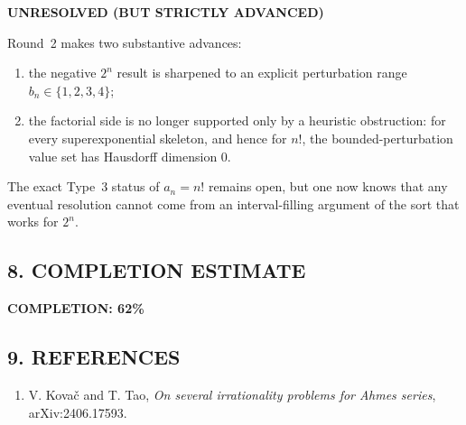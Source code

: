 \textbf{UNRESOLVED (BUT STRICTLY ADVANCED)}

\medskip
Round~2 makes two substantive advances:

\begin{enumerate}
\item the negative $2^n$ result is sharpened to an explicit perturbation range $b_n\in\{1,2,3,4\}$;
\item the factorial side is no longer supported only by a heuristic obstruction: for every superexponential skeleton, and hence for $n!$, the bounded-perturbation value set has Hausdorff dimension $0$.
\end{enumerate}

The exact Type~3 status of $a_n=n!$ remains open, but one now knows that any eventual resolution cannot come from an interval-filling argument of the sort that works for $2^n$.

\subsection*{8. COMPLETION ESTIMATE}

\textbf{COMPLETION: 62\%}

\subsection*{9. REFERENCES}

\begin{enumerate}
\item V. Kova\v c and T. Tao, \emph{On several irrationality problems for Ahmes series}, arXiv:2406.17593.
\end{enumerate}



